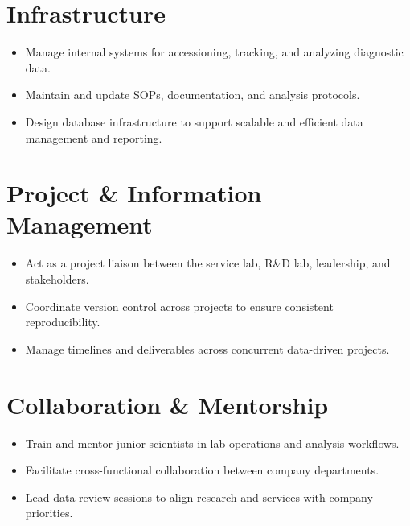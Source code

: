 \documentclass[11pt]{article}
\begin{document}
    \section*{Infrastructure}
    \begin{itemize}
        \item Manage internal systems for accessioning, tracking, and analyzing diagnostic data.
        \item Maintain and update SOPs, documentation, and analysis protocols.
        \item Design database infrastructure to support scalable and efficient data management and reporting.
    \end{itemize}

    \section*{Project \& Information Management}
    \begin{itemize}
        \item Act as a project liaison between the service lab, R\&D lab, leadership, and stakeholders.
        \item Coordinate version control across projects to ensure consistent reproducibility.
        \item Manage timelines and deliverables across concurrent data-driven projects.
    \end{itemize}

    \section*{Collaboration \& Mentorship}
    \begin{itemize}
        \item Train and mentor junior scientists in lab operations and analysis workflows.
        \item Facilitate cross-functional collaboration between company departments.
        \item Lead data review sessions to align research and services with company priorities.
    \end{itemize}
\end{document}
